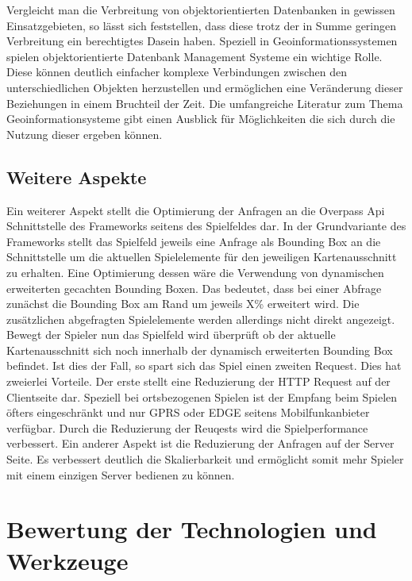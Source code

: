 Vergleicht man die Verbreitung von objektorientierten Datenbanken in gewissen Einsatzgebieten, so lässt sich feststellen, dass diese trotz der in Summe geringen Verbreitung ein berechtigtes Dasein haben. Speziell in Geoinformationssystemen spielen objektorientierte Datenbank Management Systeme ein wichtige Rolle.\cite{Brinkhoff.2005} Diese können deutlich einfacher komplexe Verbindungen zwischen den unterschiedlichen Objekten herzustellen und ermöglichen eine Veränderung dieser Beziehungen in einem Bruchteil der Zeit. Die umfangreiche Literatur zum Thema Geoinformationsysteme gibt einen Ausblick für Möglichkeiten die sich durch die Nutzung dieser ergeben können.

\subsection*{Weitere Aspekte}

Ein weiterer Aspekt stellt die Optimierung der Anfragen an die Overpass Api Schnittstelle des Frameworks seitens des Spielfeldes dar. In der Grundvariante des Frameworks stellt das Spielfeld jeweils eine Anfrage als Bounding Box an die Schnittstelle um die aktuellen Spielelemente für den jeweiligen Kartenausschnitt zu erhalten. Eine Optimierung dessen wäre die Verwendung von dynamischen erweiterten gecachten Bounding Boxen. Das bedeutet, dass bei einer Abfrage zunächst die Bounding Box am Rand um jeweils X\% erweitert wird. Die zusätzlichen abgefragten Spielelemente werden allerdings nicht direkt angezeigt. Bewegt der Spieler nun das Spielfeld wird überprüft ob der aktuelle Kartenausschnitt sich noch innerhalb der dynamisch erweiterten Bounding Box befindet. Ist dies der Fall, so spart sich das Spiel einen zweiten Request. Dies hat zweierlei Vorteile. Der erste stellt eine Reduzierung der HTTP Request auf der Clientseite dar. Speziell bei ortsbezogenen Spielen ist der Empfang beim Spielen öfters eingeschränkt und nur GPRS oder EDGE seitens Mobilfunkanbieter verfügbar. Durch die Reduzierung der Reuqests wird die Spielperformance verbessert. Ein anderer Aspekt ist die Reduzierung der Anfragen auf der Server Seite. Es verbessert deutlich die Skalierbarkeit und ermöglicht somit mehr Spieler mit einem einzigen Server bedienen zu können.


\section{Bewertung der Technologien und Werkzeuge}

